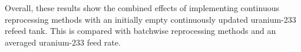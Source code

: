 Overall, these results show the combined effects of implementing continuous reprocessing methods with an initially empty continuously updated uranium-233 refeed tank. This is compared with batchwise reprocessing methods and an averaged uranium-233 feed rate.









